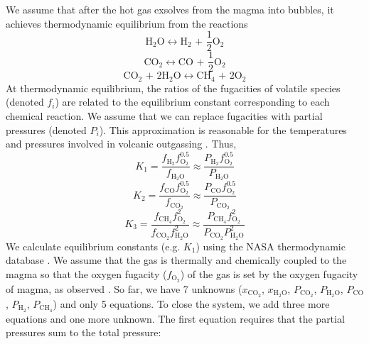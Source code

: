 We assume that after the hot gas exsolves from the magma into bubbles, it achieves thermodynamic equilibrium from the reactions
\begin{equation}
    {{\text{H}}_{\text{2}}}{\text{O}} \leftrightarrow {{\text{H}}_{\text{2}}}{\text{ + }}\frac{{\text{1}}}{{\text{2}}}{{\text{O}}_{\text{2}}}
\end{equation}
\begin{equation}
    {\text{C}}{{\text{O}}_{\text{2}}} \leftrightarrow {\text{CO + }}\frac{{\text{1}}}{{\text{2}}}{{\text{O}}_{\text{2}}}
\end{equation}
\begin{equation}
    {\text{C}}{{\text{O}}_{\text{2}}}{\text{ + 2}}{{\text{H}}_{\text{2}}}{\text{O}} \leftrightarrow {\text{C}}{{\text{H}}_{\text{4}}}{\text{ + 2}}{{\text{O}}_{\text{2}}}
\end{equation}
At thermodynamic equilibrium, the ratios of the fugacities of volatile species (denoted $f_i$) are related to the equilibrium constant corresponding to each chemical reaction. We assume that we can replace fugacities with partial pressures (denoted $P_i$). This approximation is reasonable for the temperatures and pressures involved in volcanic outgassing \citep{Holland_1984}. Thus,
\begin{equation}\label{eq:react1}
    {K_1} = \frac{{{f_{{{\text{H}}_2}}}f_{{{\text{O}}_{\text{2}}}}^{0.5}}}{{{f_{{{\text{H}}_{\text{2}}}{\text{O}}}}}} \approx \frac{{{P_{{{\text{H}}_2}}}f_{{{\text{O}}_{\text{2}}}}^{0.5}}}{{{P_{{{\text{H}}_{\text{2}}}{\text{O}}}}}}
\end{equation}
\begin{equation}\label{eq:react2}
    {K_2} = \frac{{{f_{{\text{CO}}}}f_{{{\text{O}}_2}}^{0.5}}}{{{f_{{\text{C}}{{\text{O}}_2}}}}} \approx \frac{{{P_{{\text{CO}}}}f_{{{\text{O}}_2}}^{0.5}}}{{{P_{{\text{C}}{{\text{O}}_2}}}}}
\end{equation}
\begin{equation}\label{eq:react3}
    {K_3} = \frac{{{f_{{\text{C}}{{\text{H}}_4}}}f_{{{\text{O}}_2}}^2}}{{{f_{{\text{C}}{{\text{O}}_2}}}f_{{{\text{H}}_2}{\text{O}}}^2}} \approx \frac{{{P_{{\text{C}}{{\text{H}}_4}}}f_{{{\text{O}}_2}}^2}}{{{P_{{\text{C}}{{\text{O}}_2}}}P_{{{\text{H}}_2}{\text{O}}}^2}} 
\end{equation}
We calculate equilibrium constants (e.g. $K_1$) using the NASA thermodynamic database \citep{Burcat_2005}. We assume that the gas is thermally and chemically coupled to the magma so that the oxygen fugacity ($f_\mathrm{O_2}$) of the gas is set by the oxygen fugacity of magma, as observed \citep{Symonds_1994}.  So far, we have 7 unknowns ($x_{\mathrm{CO_2}}$, $x_{\mathrm{H_2O}}$, $P_{\mathrm{CO_2}}$, $P_{\mathrm{H_2O}}$, $P_{\mathrm{CO}}$, $P_{\mathrm{H_2}}$, $P_{\mathrm{CH_4}}$) and only 5 equations. To close the system, we add three more equations and one more unknown. The first equation requires that the partial pressures sum to the total pressure:

